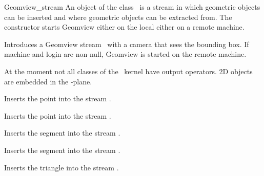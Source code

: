 \begin{ccClass}{Geomview_stream}
\ccDefinition
An object of the class \ccClassName\ is a stream in which geometric
objects can be inserted and where geometric objects can be extracted
from. The constructor starts Geomview either on the local either on
a remote machine.


\ccThreeToTwo
\ccCreation
{}

{Introduces a Geomview stream \ccVar\ with a camera that sees the
bounding box. If machine and login are non-null, Geomview is started
on the remote machine.}



\ccOperations



\def\ccTagRmEigenClassName{\ccFalse}

At the moment not all classes of the \cgal\ kernel have output
operators. 2D objects are embedded in the -plane.

{Inserts the point  into the stream \ccVar.}

\newpage
{}
{Inserts the point  into the stream \ccVar.}


{Inserts the segment  into the stream \ccVar.}

{Inserts the segment  into the stream \ccVar.}


{Inserts the triangle  into the stream \ccVar.}



\end{ccClass}

